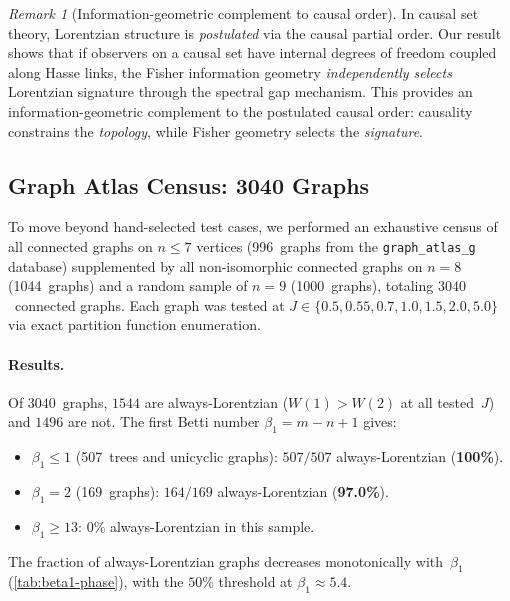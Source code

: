 \documentclass[11pt]{article}
\theoremstyle{definition}
\theoremstyle{remark}
\newtheorem{remark}[theorem]{Remark}
\begin{document}
\begin{remark}[Information-geometric complement to causal order]
\label{rem:causal-complement}
In causal set theory, Lorentzian structure is \emph{postulated} via the
causal partial order. Our result shows that if observers on a causal set
have internal degrees of freedom coupled along Hasse links, the Fisher
information geometry \emph{independently selects} Lorentzian signature
through the spectral gap mechanism. This provides an
information-geometric complement to the postulated causal order:
causality constrains the \emph{topology}, while Fisher geometry selects
the \emph{signature}.
\end{remark}


\subsection{Graph Atlas Census: 3040 Graphs}
\label{sec:atlas-census}

To move beyond hand-selected test cases, we performed an exhaustive census
of all connected graphs on $n \leq 7$ vertices (996~graphs from the
\texttt{graph\_atlas\_g} database) supplemented by all non-isomorphic
connected graphs on $n = 8$ (1044~graphs) and a random sample of $n = 9$
(1000~graphs), totaling $3040$~connected graphs. Each graph was tested at
$J \in \{0.5, 0.55, 0.7, 1.0, 1.5, 2.0, 5.0\}$ via exact partition
function enumeration.

\paragraph{Results.}
Of $3040$~graphs, $1544$ are always-Lorentzian ($W(1) > W(2)$ at all tested~$J$)
and $1496$ are not. The first Betti number $\beta_1 = m - n + 1$ gives:
\begin{itemize}
\item $\beta_1 \leq 1$ (507~trees and unicyclic graphs): $507/507$ always-Lorentzian (\textbf{100\%}).
\item $\beta_1 = 2$ (169~graphs): $164/169$ always-Lorentzian (\textbf{97.0\%}).
\item $\beta_1 \geq 13$: $0\%$ always-Lorentzian in this sample.
\end{itemize}
The fraction of always-Lorentzian graphs decreases monotonically with~$\beta_1$
(\cref{tab:beta1-phase}), with the $50\%$ threshold at $\beta_1 \approx 5.4$.
\end{document}
